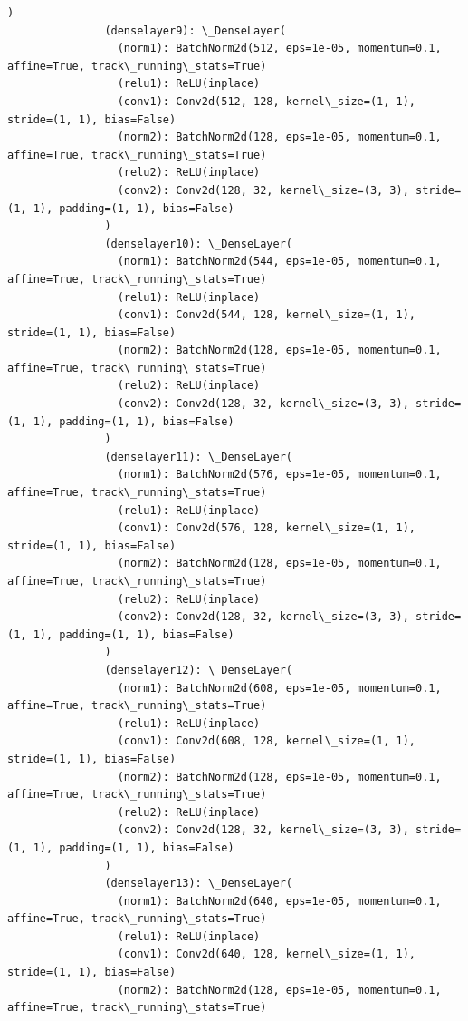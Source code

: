 \documentclass[11pt]{article}
\begin{document}
\begin{Verbatim}[commandchars=\\\{\}]
               )
               (denselayer9): \_DenseLayer(
                 (norm1): BatchNorm2d(512, eps=1e-05, momentum=0.1, affine=True, track\_running\_stats=True)
                 (relu1): ReLU(inplace)
                 (conv1): Conv2d(512, 128, kernel\_size=(1, 1), stride=(1, 1), bias=False)
                 (norm2): BatchNorm2d(128, eps=1e-05, momentum=0.1, affine=True, track\_running\_stats=True)
                 (relu2): ReLU(inplace)
                 (conv2): Conv2d(128, 32, kernel\_size=(3, 3), stride=(1, 1), padding=(1, 1), bias=False)
               )
               (denselayer10): \_DenseLayer(
                 (norm1): BatchNorm2d(544, eps=1e-05, momentum=0.1, affine=True, track\_running\_stats=True)
                 (relu1): ReLU(inplace)
                 (conv1): Conv2d(544, 128, kernel\_size=(1, 1), stride=(1, 1), bias=False)
                 (norm2): BatchNorm2d(128, eps=1e-05, momentum=0.1, affine=True, track\_running\_stats=True)
                 (relu2): ReLU(inplace)
                 (conv2): Conv2d(128, 32, kernel\_size=(3, 3), stride=(1, 1), padding=(1, 1), bias=False)
               )
               (denselayer11): \_DenseLayer(
                 (norm1): BatchNorm2d(576, eps=1e-05, momentum=0.1, affine=True, track\_running\_stats=True)
                 (relu1): ReLU(inplace)
                 (conv1): Conv2d(576, 128, kernel\_size=(1, 1), stride=(1, 1), bias=False)
                 (norm2): BatchNorm2d(128, eps=1e-05, momentum=0.1, affine=True, track\_running\_stats=True)
                 (relu2): ReLU(inplace)
                 (conv2): Conv2d(128, 32, kernel\_size=(3, 3), stride=(1, 1), padding=(1, 1), bias=False)
               )
               (denselayer12): \_DenseLayer(
                 (norm1): BatchNorm2d(608, eps=1e-05, momentum=0.1, affine=True, track\_running\_stats=True)
                 (relu1): ReLU(inplace)
                 (conv1): Conv2d(608, 128, kernel\_size=(1, 1), stride=(1, 1), bias=False)
                 (norm2): BatchNorm2d(128, eps=1e-05, momentum=0.1, affine=True, track\_running\_stats=True)
                 (relu2): ReLU(inplace)
                 (conv2): Conv2d(128, 32, kernel\_size=(3, 3), stride=(1, 1), padding=(1, 1), bias=False)
               )
               (denselayer13): \_DenseLayer(
                 (norm1): BatchNorm2d(640, eps=1e-05, momentum=0.1, affine=True, track\_running\_stats=True)
                 (relu1): ReLU(inplace)
                 (conv1): Conv2d(640, 128, kernel\_size=(1, 1), stride=(1, 1), bias=False)
                 (norm2): BatchNorm2d(128, eps=1e-05, momentum=0.1, affine=True, track\_running\_stats=True)

\end{Verbatim}
\end{document}
